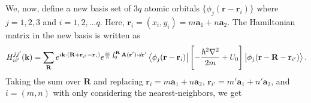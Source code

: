 \documentclass{report}
\begin{document}
We, now, define a new basis set of $3q$ atomic orbitals $\{ \phi_{j}(\mathbf{r} - \mathbf{r}_{i}) \}$ where $j=1,2,3$ and $i = 1,2,...q$. Here, $\mathbf{r}_{i} = (x_{i},y_{i}) = m \mathbf{a}_{1} + n\mathbf{a}_{2}$. The Hamiltonian matrix in the new basis is written as
\begin{gather}
	H_{ii'}^{jj'}(\mathbf{k})
	= \sum_{\mathbf{R}} e^{i \mathbf{k} \cdot (\mathbf{R} + \mathbf{r}_{i'} - \mathbf{r}_{i})} e^{\frac{ie}{\hbar} \int_{0}^{\mathbf{R}} \mathbf{A}(\mathbf{r}')\cdot d\mathbf{r}'} \bra{\phi_{j}(\mathbf{r} - \mathbf{r}_{i})} \left[-\frac{\hbar^{2} \nabla^{2}}{2m} + U_{0}\right] \ket{\phi_{j}(\mathbf{r} - \mathbf{R} - \mathbf{r}_{i'})}.
\end{gather}
Taking the sum over $\mathbf{R}$ and replacing $\mathbf{r}_{i} = m \mathbf{a}_{1} + n\mathbf{a}_{2} $, $\mathbf{r}_{i'} = m' \mathbf{a}_{1} + n' \mathbf{a}_{2}$, and $i = (m,n)$ with only considering the nearest-neighbors, we get
\end{document}
